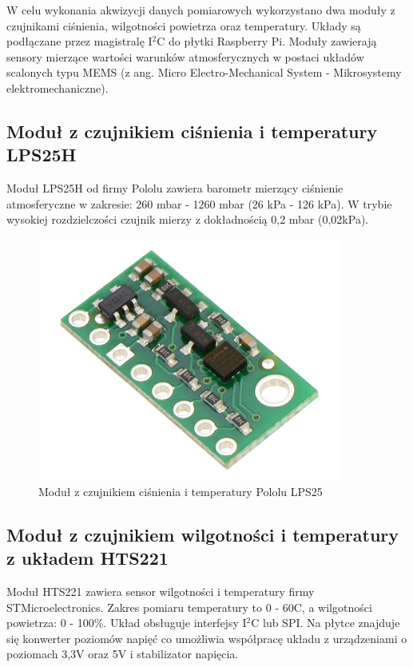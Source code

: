 W celu wykonania akwizycji danych pomiarowych wykorzystano dwa moduły z czujnikami ciśnienia, wilgotności powietrza oraz temperatury. Układy są  podłączane przez magistralę I$^2$C do płytki Raspberry Pi. Moduły zawierają sensory mierzące wartości warunków atmosferycznych w postaci układów scalonych typu MEMS (z ang. Micro Electro-Mechanical System - Mikrosystemy elektromechaniczne).

\newpage

\subsection{Moduł z czujnikiem ciśnienia i temperatury LPS25H}

Moduł LPS25H od firmy Pololu zawiera barometr mierzący ciśnienie atmosferyczne w zakresie: 260 mbar - 1260 mbar (26 kPa - 126 kPa). W trybie wysokiej rozdzielczości czujnik mierzy z dokładnością 0,2 mbar (0,02kPa).

\begin{figure}[H]
	\centering
		\includegraphics[width=10cm]{pololu}
	\caption{Moduł z czujnikiem ciśnienia i temperatury Pololu LPS25} 
	\label{pic:pololu}
\end{figure}

\subsection{Moduł z czujnikiem wilgotności i temperatury z układem HTS221}

Moduł HTS221 zawiera sensor wilgotności i temperatury firmy STMicroelectronics. Zakres pomiaru temperatury to 0 - 60\degree C, a wilgotności powietrza: 0 - 100\%. Układ obsługuje interfejsy I$^2$C lub SPI. Na płytce znajduje się konwerter poziomów napięć co umożliwia współpracę układu z urządzeniami o poziomach 3,3V oraz 5V i stabilizator napięcia.

